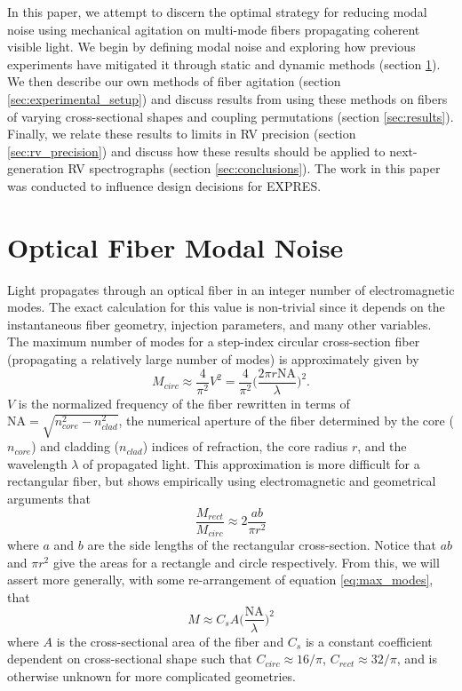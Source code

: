 \documentclass[twocolumn]{emulateapj}
\begin{document}
In this paper, we attempt to discern the optimal strategy for reducing modal noise using mechanical agitation on multi-mode fibers propagating coherent visible light. We begin by defining modal noise and exploring how previous experiments have mitigated it through static and dynamic methods (section \ref{sec:modal_noise_intro}). We then describe our own methods of fiber agitation (section \ref{sec:experimental_setup}) and discuss results from using these methods on fibers of varying cross-sectional shapes and coupling permutations (section \ref{sec:results}). Finally, we relate these results to limits in RV precision (section \ref{sec:rv_precision}) and discuss how these results should be applied to next-generation RV spectrographs (section \ref{sec:conclusions}). The work in this paper was conducted to influence design decisions for EXPRES.

\section{Optical Fiber Modal Noise}
\label{sec:modal_noise_intro}

Light propagates through an optical fiber in an integer number of electromagnetic modes. The exact calculation for this value is non-trivial since it depends on the instantaneous fiber geometry, injection parameters, and many other variables. The maximum number of modes for a step-index circular cross-section fiber (propagating a relatively large number of modes) is approximately given by
\begin{equation}
M_{circ} \approx \frac{4}{\pi ^2} V^2 = \frac{4}{\pi ^2} \Bigg( \frac{2 \pi r \mathrm{NA}}{\lambda} \Bigg) ^2.
\label{eq:max_modes}
\end{equation}
$V$ is the normalized frequency of the fiber rewritten in terms of $\mathrm{NA} = \sqrt{n_{core}^2 - n_{clad}^2}$, the numerical aperture of the fiber determined by the core ($n_{core}$) and cladding ($n_{clad}$) indices of refraction, the core radius $r$, and the wavelength $\lambda$ of propagated light. This approximation is more difficult for a rectangular fiber, but \citet{Nikitin2011} shows empirically using electromagnetic and geometrical arguments that
\begin{equation}
\frac{M_{rect}}{M_{circ}} \approx 2 \frac{ab}{\pi r^2}
\label{eq:prop_modes}
\end{equation}
where $a$ and $b$ are the side lengths of the rectangular cross-section. Notice that $ab$ and $\pi r^2$ give the areas for a rectangle and circle respectively. From this, we will assert more generally, with some re-arrangement of equation \ref{eq:max_modes}, that
\begin{equation}
M \approx C_{s} A \Bigg( \frac{\mathrm{NA}}{\lambda} \Bigg) ^2
\label{eq:mode_area}
\end{equation}
where $A$ is the cross-sectional area of the fiber and $C_{s}$ is a constant coefficient dependent on cross-sectional shape such that $C_{circ} \approx 16/\pi$, $C_{rect} \approx 32/\pi$, and is otherwise unknown for more complicated geometries.
\end{document}
